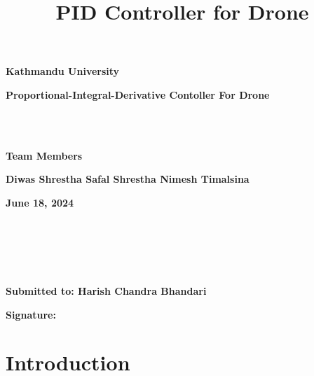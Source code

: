 \documentclass[a4paper,12pt]{article}
\title{PID Controller for Drone}
\begin{document}
\begin{center}
\textbf{\fontsize{50pt}{50pt} \selectfont Kathmandu University}
\end{center}

\vspace{2cm}

\begin{center}
\end{center}


\vspace{2cm}

\begin{center}
\textbf{\LARGE Proportional-Integral-Derivative Contoller For Drone}
\end{center}

\\~\\

\begin{center}
    \textbf{\Large Team Members}
\end{center}

\begin{center}
\textbf{Diwas Shrestha \quad Safal Shrestha \quad Nimesh Timalsina} 
\end{center}

\begin{center}
    \textbf{June 18, 2024}
\end{center}

\\~\\~\\~\\

\begin{center}
    \textbf{Submitted to: Harish Chandra Bhandari} 
\end{center}

\begin{center}
    \textbf{Signature: \underline{\hspace{4cm}}}
\end{center}



\pagebreak

\tableofcontents

\pagebreak
\section{Introduction}
\end{document}

